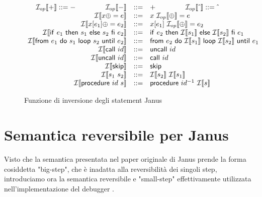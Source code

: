\documentclass{article}
\theoremstyle{plain}
\theoremstyle{definition}
\theoremstyle{plain}
\newcommand{\ms}[1]{\mathsf{#1}}
\begin{document}
\begin{figure}[h]
\small
\begin{center}
$
\begin{array}{rcl@{~~~~~~}rcl@{ }}
\mathcal{I}_{op}\llbracket + \rrbracket ::= - \hspace{1,5cm} 
\mathcal{I}_{op}\llbracket - \rrbracket & ::= & + \hspace{1,5cm}
\mathcal{I}_{op}\llbracket \hat{~} \rrbracket ::= \hat{~} \\
\mathcal{I}\llbracket x\oplus= e \rrbracket & ::= & x~\mathcal{I}_{op}\llbracket \oplus \rrbracket= e \\
\mathcal{I}\llbracket  x[e_1]\oplus=e_2 \rrbracket & ::= & x[e_1]~\mathcal{I}_{op}\llbracket \oplus \rrbracket= e_2 \\
\mathcal{I}\llbracket \ms{if}~e_1 ~\ms{then} ~s_1~\ms{else}~s_2~\ms{fi}~e_2 \rrbracket & ::= & \ms{if}~e_2 ~\ms{then} ~\mathcal{I}\llbracket s_1 \rrbracket~\ms{else}~\mathcal{I}\llbracket s_2 \rrbracket~\ms{fi}~e_1 \\
\mathcal{I}\llbracket \ms{from}~e_1~\ms{do}~s_1~\ms{loop}~s_2~\ms{until}~e_2 \rrbracket & ::= & \ms{from}~e_2~\ms{do}~\mathcal{I}\llbracket s_1 \rrbracket~\ms{loop}~\mathcal{I}\llbracket s_2 \rrbracket~\ms{until}~e_1 \\		
\mathcal{I}\llbracket \ms{call}~id \rrbracket & ::= & \ms{uncall}~id \\
\mathcal{I}\llbracket \ms{uncall}~id \rrbracket & ::= &   \ms{call}~id \\
\mathcal{I}\llbracket \ms{skip} \rrbracket & ::= & \ms{skip} \\
\mathcal{I}\llbracket s_1~s_2 \rrbracket & ::= & \mathcal{I}\llbracket s_2 \rrbracket ~ \mathcal{I}\llbracket s_1 \rrbracket \\
\mathcal{I}\llbracket \ms{procedure}~id~s \rrbracket & ::= & \ms{procedure} ~id^{-1}~\mathcal{I}\llbracket s \rrbracket \\
\end{array}
$
\end{center}
\caption{Funzione di inversione degli statement Janus} \label{fig:inverter}
\end{figure}

\section{Semantica reversibile per Janus}
\label{sec:LV26}
Visto che la semantica presentata nel paper originale di Janus prende la forma cosiddetta "big-step", che è inadatta alla reversibilità dei singoli step, introduciamo ora la semantica reversibile e "small-step" effettivamente utilizzata nell'implementazione del debugger \cite{LV26}.
\bigskip
\end{document}

